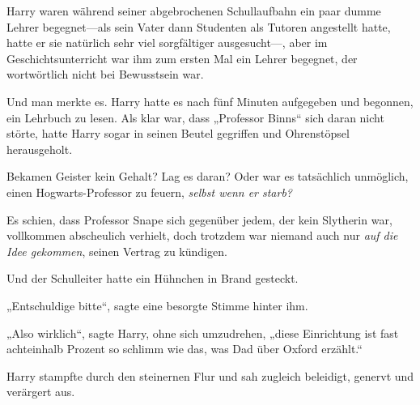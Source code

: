 Harry waren während seiner abgebrochenen Schullaufbahn ein paar dumme Lehrer begegnet—als sein Vater dann Studenten als Tutoren angestellt hatte, hatte er sie natürlich sehr viel sorgfältiger ausgesucht—, aber im Geschichtsunterricht war ihm zum ersten Mal ein Lehrer begegnet, der wortwörtlich nicht bei Bewusstsein war.

Und man merkte es. Harry hatte es nach fünf Minuten aufgegeben und begonnen, ein Lehrbuch zu lesen. Als klar war, dass „Professor Binns“ sich daran nicht störte, hatte Harry sogar in seinen Beutel gegriffen und Ohrenstöpsel herausgeholt.

Bekamen Geister kein Gehalt? Lag es daran? Oder war es tatsächlich unmöglich, einen Hogwarts-Professor zu feuern, \emph{selbst wenn er starb?}

Es schien, dass Professor Snape sich gegenüber jedem, der kein Slytherin war, vollkommen abscheulich verhielt, doch trotzdem war niemand auch nur \emph{auf die Idee gekommen}, seinen Vertrag zu kündigen.

Und der Schulleiter hatte ein Hühnchen in Brand gesteckt.

„Entschuldige bitte“, sagte eine besorgte Stimme hinter ihm.

„Also wirklich“, sagte Harry, ohne sich umzudrehen, „diese Einrichtung ist fast achteinhalb Prozent so schlimm wie das, was Dad über Oxford erzählt.“

\later

Harry stampfte durch den steinernen Flur und sah zugleich beleidigt, genervt und verärgert aus.

